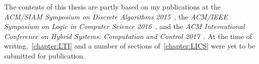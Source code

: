 \begin{originality}
  The contents of this thesis are partly based on my publications at the \emph{ACM/SIAM Symposium on Discrete Algorithms 2015}~\cite{SODA15}, the \emph{ACM/IEEE Symposium on Logic in Computer Science 2016}~\cite{LICS16}, and the \emph{ACM International Conference on Hybrid Systems: Computation and Control 2017}~\cite{HSCC17}. At the time of writing,~\cref{chapter:LTI} and a number of sections of~\cref{chapter:LICS} were yet to be submitted for publication.
\end{originality}

